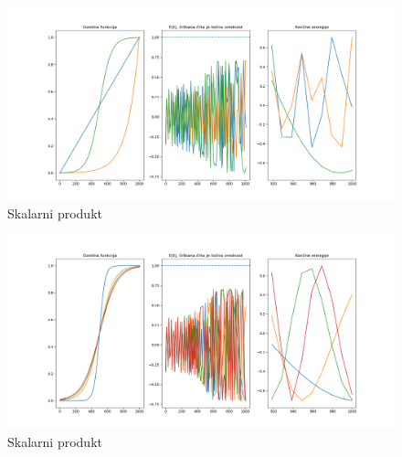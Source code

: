 \documentclass{article}
\begin{document}
\begin{figure}[H]
    \centering
    \includegraphics[width = \linewidth]{dot_various.png}
    \caption{Skalarni produkt}
    \label{fig:enter-label}
\end{figure}
\begin{figure}[H]
    \centering
    \includegraphics[width = \linewidth]{dot_fermis.png}
    \caption{Skalarni produkt}
    \label{fig:enter-label}
\end{figure}
\end{document}
